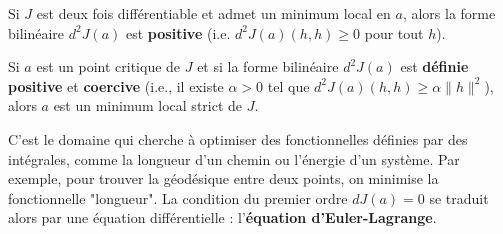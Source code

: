 \begin{proposition}
    Si $J$ est deux fois différentiable et admet un minimum local en $a$, alors la forme bilinéaire $d^2J(a)$ est \textbf{positive} (i.e. $d^2J(a)(h,h) \ge 0$ pour tout $h$).
\end{proposition}

\begin{proposition}
    Si $a$ est un point critique de $J$ et si la forme bilinéaire $d^2J(a)$ est \textbf{définie positive} et \textbf{coercive} (i.e., il existe $\alpha>0$ tel que $d^2J(a)(h,h) \ge \alpha \|h\|^2$), alors $a$ est un minimum local strict de $J$.
\end{proposition}

\begin{application}
    C'est le domaine qui cherche à optimiser des fonctionnelles définies par des intégrales, comme la longueur d'un chemin ou l'énergie d'un système.
    Par exemple, pour trouver la géodésique entre deux points, on minimise la fonctionnelle "longueur". La condition du premier ordre $dJ(a)=0$ se traduit alors par une équation différentielle : l'\textbf{équation d'Euler-Lagrange}.
\end{application}